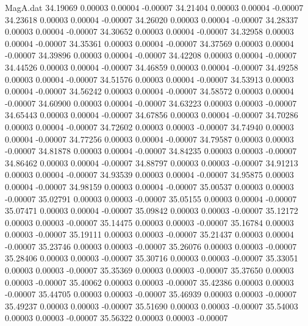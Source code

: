 \begin{filecontents}{MagA.dat}
  34.19069    0.00003    0.00004   -0.00007
  34.21404    0.00003    0.00004   -0.00007
  34.23618    0.00003    0.00004   -0.00007
  34.26020    0.00003    0.00004   -0.00007
  34.28337    0.00003    0.00004   -0.00007
  34.30652    0.00003    0.00004   -0.00007
  34.32958    0.00003    0.00004   -0.00007
  34.35361    0.00003    0.00004   -0.00007
  34.37569    0.00003    0.00004   -0.00007
  34.39896    0.00003    0.00004   -0.00007
  34.42208    0.00003    0.00004   -0.00007
  34.44526    0.00003    0.00004   -0.00007
  34.46859    0.00003    0.00004   -0.00007
  34.49258    0.00003    0.00004   -0.00007
  34.51576    0.00003    0.00004   -0.00007
  34.53913    0.00003    0.00004   -0.00007
  34.56242    0.00003    0.00004   -0.00007
  34.58572    0.00003    0.00004   -0.00007
  34.60900    0.00003    0.00004   -0.00007
  34.63223    0.00003    0.00003   -0.00007
  34.65443    0.00003    0.00004   -0.00007
  34.67856    0.00003    0.00004   -0.00007
  34.70286    0.00003    0.00004   -0.00007
  34.72602    0.00003    0.00003   -0.00007
  34.74940    0.00003    0.00004   -0.00007
  34.77256    0.00003    0.00004   -0.00007
  34.79587    0.00003    0.00003   -0.00007
  34.81878    0.00003    0.00004   -0.00007
  34.84235    0.00003    0.00003   -0.00007
  34.86462    0.00003    0.00004   -0.00007
  34.88797    0.00003    0.00003   -0.00007
  34.91213    0.00003    0.00004   -0.00007
  34.93539    0.00003    0.00004   -0.00007
  34.95875    0.00003    0.00004   -0.00007
  34.98159    0.00003    0.00004   -0.00007
  35.00537    0.00003    0.00003   -0.00007
  35.02791    0.00003    0.00003   -0.00007
  35.05155    0.00003    0.00004   -0.00007
  35.07471    0.00003    0.00004   -0.00007
  35.09842    0.00003    0.00003   -0.00007
  35.12172    0.00003    0.00003   -0.00007
  35.14475    0.00003    0.00003   -0.00007
  35.16784    0.00003    0.00003   -0.00007
  35.19111    0.00003    0.00003   -0.00007
  35.21437    0.00003    0.00004   -0.00007
  35.23746    0.00003    0.00003   -0.00007
  35.26076    0.00003    0.00003   -0.00007
  35.28406    0.00003    0.00003   -0.00007
  35.30716    0.00003    0.00003   -0.00007
  35.33051    0.00003    0.00003   -0.00007
  35.35369    0.00003    0.00003   -0.00007
  35.37650    0.00003    0.00003   -0.00007
  35.40062    0.00003    0.00003   -0.00007
  35.42386    0.00003    0.00003   -0.00007
  35.44705    0.00003    0.00003   -0.00007
  35.46939    0.00003    0.00003   -0.00007
  35.49237    0.00003    0.00003   -0.00007
  35.51690    0.00003    0.00003   -0.00007
  35.54003    0.00003    0.00003   -0.00007
  35.56322    0.00003    0.00003   -0.00007

\end{filecontents}
